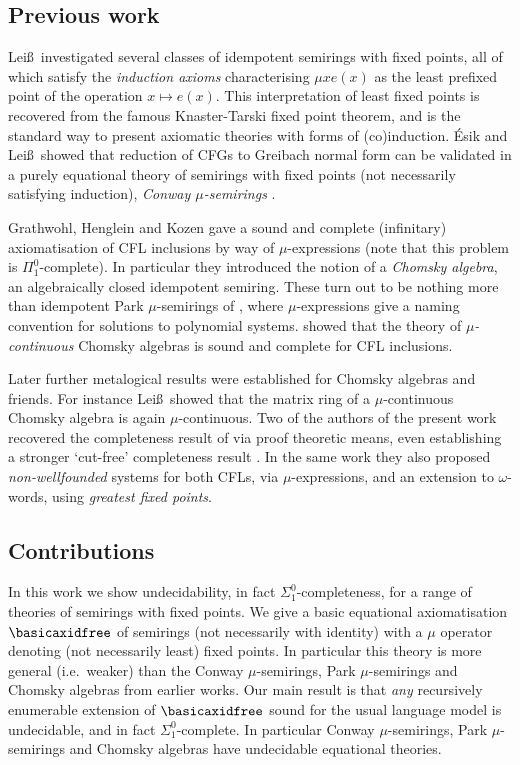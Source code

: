 \documentclass[runningheads]{amsart}
\begin{document}
\subsection{Previous work}
Lei\ss\ investigated several classes of idempotent semirings with fixed points, all of which satisfy the \emph{induction axioms} characterising $\mu x e(x)$ as the least prefixed point of the operation $x\mapsto e(x)$. 
This interpretation of least fixed points is recovered from the famous Knaster-Tarski fixed point theorem, and is the standard way to present axiomatic theories with forms of (co)induction.
\'Esik and Lei\ss\ showed that reduction of CFGs to Greibach normal form \cite{Greibach1965} can be validated in a purely equational theory of semirings with fixed points (not necessarily satisfying induction), \emph{Conway $\mu$-semirings} \cite{EsikLeiss02,EsikLeiss05}. 

Grathwohl, Henglein and Kozen gave a sound and complete (infinitary) axiomatisation of CFL inclusions by way of $\mu$-expressions \cite{GHK13} (note that this problem is $\Pi^0_1$-complete). 
In particular they introduced the notion of a \emph{Chomsky algebra}, an algebraically closed idempotent semiring.
These turn out to be nothing more than idempotent Park $\mu$-semirings of \cite{Leiss92:ka-with-recursion,EsikLeiss02,EsikLeiss05}, where $\mu$-expressions give a naming convention for solutions to polynomial systems.
\cite{GHK13} showed that the theory of \emph{$\mu$-continuous} Chomsky algebras is sound and complete for CFL inclusions.

Later further metalogical results were established for Chomsky algebras and friends.
For instance Lei\ss\ showed that the matrix ring of a $\mu$-continuous Chomsky algebra is again $\mu$-continuous.
Two of the authors of the present work recovered the completeness result of \cite{GHK13} via proof theoretic means, even establishing a stronger `cut-free' completeness result \cite{DasDe24:omega-cfls}. 
In the same work they also proposed \emph{non-wellfounded} systems for both CFLs, via $\mu$-expressions, and an extension to $\omega$-words, using \emph{greatest fixed points}.



\subsection{Contributions}
In this work we show undecidability, in fact $\Sigma^0_1$-completeness, for a range of theories of semirings with fixed points. We give a basic equational axiomatisation $\basicaxidfree$ of semirings (not necessarily with identity) with a $\mu$ operator denoting (not necessarily least) fixed points.
In particular this theory is more general (i.e.\ weaker) than the Conway $\mu$-semirings, Park $\mu$-semirings and Chomsky algebras from earlier works.
Our main result is that \emph{any} recursively enumerable extension of $\basicaxidfree$ sound for the usual language model is undecidable, and in fact $\Sigma^0_1$-complete.
In particular Conway $\mu$-semirings, Park $\mu$-semirings and Chomsky algebras have undecidable equational theories.
\end{document}
